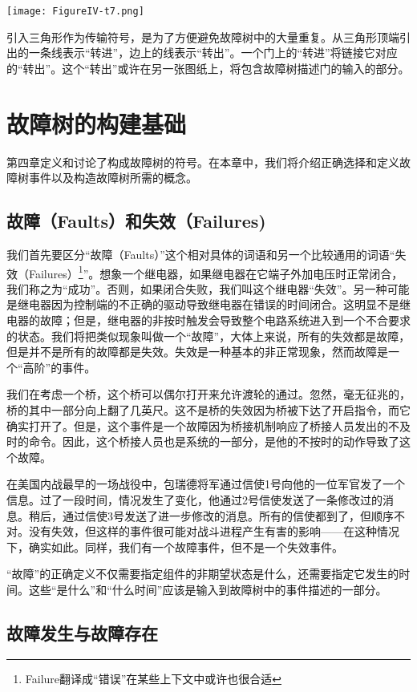 \documentclass[cn,11pt,chinese]{elegantbook}
\begin{document}
\texttt{[image: FigureIV-t7.png]}

引入三角形作为传输符号，是为了方便避免故障树中的大量重复。从三角形顶端引出的一条线表示“转进”，边上的线表示“转出”。一个门上的“转进”将链接它对应的“转出”。这个“转出”或许在另一张图纸上，将包含故障树描述门的输入的部分。


\chapter{故障树的构建基础}

第四章定义和讨论了构成故障树的符号。在本章中，我们将介绍正确选择和定义故障树事件以及构造故障树所需的概念。

\section{故障（Faults）和失效（Failures)}

我们首先要区分“故障（Faults）”这个相对具体的词语和另一个比较通用的词语“失效（Failures）\footnote{Failure翻译成“错误”在某些上下文中或许也很合适}”。想象一个继电器，如果继电器在它端子外加电压时正常闭合，我们称之为“成功”。否则，如果闭合失败，我们叫这个继电器“失效”。另一种可能是继电器因为控制端的不正确的驱动导致继电器在错误的时间闭合。这明显不是继电器的故障；但是，继电器的非按时触发会导致整个电路系统进入到一个不合要求的状态。我们将把类似现象叫做一个“故障”，大体上来说，所有的失效都是故障，但是并不是所有的故障都是失效。失效是一种基本的非正常现象，然而故障是一个“高阶”的事件。

我们在考虑一个桥，这个桥可以偶尔打开来允许渡轮的通过。忽然，毫无征兆的，桥的其中一部分向上翻了几英尺。这不是桥的失效因为桥被下达了开启指令，而它确实打开了。但是，这个事件是一个故障因为桥接机制响应了桥接人员发出的不及时的命令。因此，这个桥接人员也是系统的一部分，是他的不按时的动作导致了这个故障。

在美国内战最早的一场战役中，包瑞德将军通过信使1号向他的一位军官发了一个信息。过了一段时间，情况发生了变化，他通过2号信使发送了一条修改过的消息。稍后，通过信使3号发送了进一步修改的消息。所有的信使都到了，但顺序不对。没有失效，但这样的事件很可能对战斗进程产生有害的影响——在这种情况下，确实如此。同样，我们有一个故障事件，但不是一个失效事件。

“故障”的正确定义不仅需要指定组件的非期望状态是什么，还需要指定它发生的时间。这些“是什么”和“什么时间”应该是输入到故障树中的事件描述的一部分。

\section{故障发生与故障存在}
\end{document}
